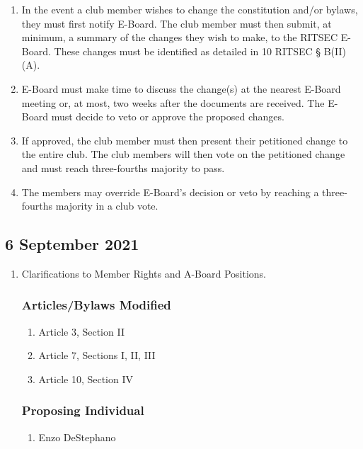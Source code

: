 
\begin{enumerate}
      \item In the event a club member wishes to change the constitution and/or bylaws,
            they must first notify E-Board. The club member must then submit, at minimum, a
            summary of the changes they wish to make, to the RITSEC E-Board. These changes
            must be identified as detailed in 10 RITSEC § B(II)(A).
      \item E-Board must make time to discuss the change(s) at the nearest E-Board meeting
            or, at most, two weeks after the documents are received. The E-Board must
            decide to veto or approve the proposed changes.
      \item If approved, the club member must then present their petitioned change to the
            entire club. The club members will then vote on the petitioned change and must
            reach three-fourths majority to pass.
      \item The members may override E-Board's decision or veto by reaching a three-fourths
            majority in a club vote.
\end{enumerate}

\subsection{6 September 2021}
\begin{enumerate}
      \item Clarifications to Member Rights and A-Board Positions.

            \subsubsection{Articles/Bylaws Modified}
            \begin{enumerate}
                  \item Article 3, Section II
                  \item Article 7, Sections I, II, III
                  \item Article 10, Section IV
            \end{enumerate}

            \subsubsection{Proposing Individual}
            \begin{enumerate}
                  \item Enzo DeStephano
            \end{enumerate}
\end{enumerate}
